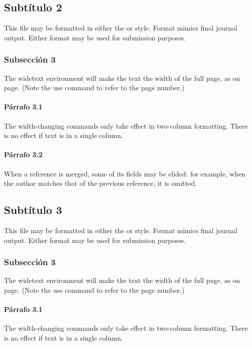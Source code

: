 \documentclass[%
 reprint,
 amsmath,amssymb,
 aps,
]{revtex4-2}
\begin{document}
\subsection{Subtítulo 2}

This file may be formatted in either the or style. Format mimics final journal output. Either format may be used for submission purposes.

\subsubsection{Subsección 3}
The widetext environment will make the text the width of the
full page, as on page. (Note the use command to refer to the page number.) 

\paragraph{Párrafo 3.1}
The width-changing commands only take effect in two-column formatting. There is no effect if text is in a single column.

\paragraph{Párrafo 3.2}
When a reference is merged, some of its fields may be elided: for example, when the author matches that of the previous reference, it is omitted. 

\subsection{Subtítulo 3}

This file may be formatted in either the or style. Format mimics final journal output. Either format may be used for submission purposes.

\subsubsection{Subsección 3}
The widetext environment will make the text the width of the
full page, as on page. (Note the use command to refer to the page number.) 

\paragraph{Párrafo 3.1}
The width-changing commands only take effect in two-column formatting. There is no effect if text is in a single column.
\end{document}
